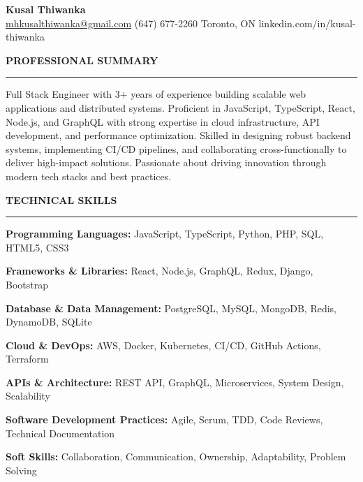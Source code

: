 \documentclass[10pt,letterpaper]{article}
\begin{document}
\begin{center}
{\LARGE\textbf{Kusal Thiwanka}}\\[3pt]
\href{mailto:mhkusalthiwanka@gmail.com}{mhkusalthiwanka@gmail.com}\hspace{2em}%
(647) 677{-}2260\hspace{2em}%
Toronto, ON\hspace{2em}
linkedin.com/in/kusal-thiwanka
\end{center}

\vspace{6pt}

\textbf{PROFESSIONAL SUMMARY}\\[-8pt]
\noindent\rule{\textwidth}{1pt}

\vspace{-2pt}

Full Stack Engineer with 3+ years of experience building scalable web applications and distributed systems. Proficient in JavaScript, TypeScript, React, Node.js, and GraphQL with strong expertise in cloud infrastructure, API development, and performance optimization. Skilled in designing robust backend systems, implementing CI/CD pipelines, and collaborating cross-functionally to deliver high-impact solutions. Passionate about driving innovation through modern tech stacks and best practices.

\vspace{8pt}

\textbf{TECHNICAL SKILLS}\\[-8pt]
\noindent\rule{\textwidth}{1pt}

\vspace{-2pt}

\textbf{Programming Languages:} JavaScript, TypeScript, Python, PHP, SQL, HTML5, CSS3

\textbf{Frameworks \& Libraries:} React, Node.js, GraphQL, Redux, Django, Bootstrap

\textbf{Database \& Data Management:} PostgreSQL, MySQL, MongoDB, Redis, DynamoDB, SQLite

\textbf{Cloud \& DevOps:} AWS, Docker, Kubernetes, CI/CD, GitHub Actions, Terraform

\textbf{APIs \& Architecture:} REST API, GraphQL, Microservices, System Design, Scalability

\textbf{Software Development Practices:} Agile, Scrum, TDD, Code Reviews, Technical Documentation

\textbf{Soft Skills:} Collaboration, Communication, Ownership, Adaptability, Problem Solving
\end{document}
